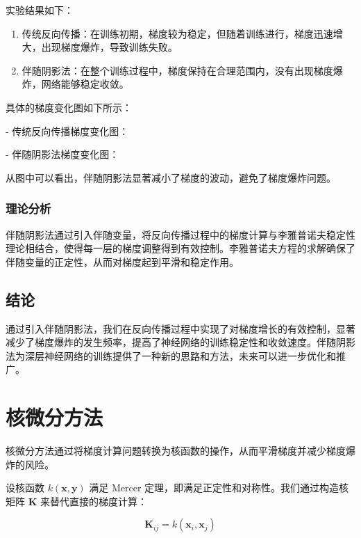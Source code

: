 实验结果如下：

\begin{enumerate}

  \item 传统反向传播：在训练初期，梯度较为稳定，但随着训练进行，梯度迅速增大，出现梯度爆炸，导致训练失败。
   
  \item 伴随阴影法：在整个训练过程中，梯度保持在合理范围内，没有出现梯度爆炸，网络能够稳定收敛。

\end{enumerate}

具体的梯度变化图如下所示：

- 传统反向传播梯度变化图：


- 伴随阴影法梯度变化图：


从图中可以看出，伴随阴影法显著减小了梯度的波动，避免了梯度爆炸问题。

\subsubsection{理论分析}

伴随阴影法通过引入伴随变量，将反向传播过程中的梯度计算与李雅普诺夫稳定性理论相结合，使得每一层的梯度调整得到有效控制。李雅普诺夫方程的求解确保了伴随变量的正定性，从而对梯度起到平滑和稳定作用。

\subsection{结论}

通过引入伴随阴影法，我们在反向传播过程中实现了对梯度增长的有效控制，显著减少了梯度爆炸的发生频率，提高了神经网络的训练稳定性和收敛速度。伴随阴影法为深层神经网络的训练提供了一种新的思路和方法，未来可以进一步优化和推广。

\section{核微分方法}

核微分方法通过将梯度计算问题转换为核函数的操作，从而平滑梯度并减少梯度爆炸的风险。

设核函数 \(k(\mathbf{x}, \mathbf{y})\) 满足 Mercer 定理，即满足正定性和对称性。我们通过构造核矩阵 \(\mathbf{K}\) 来替代直接的梯度计算：

\[ \mathbf{K}_{ij} = k(\mathbf{x}_i, \mathbf{x}_j) \]

